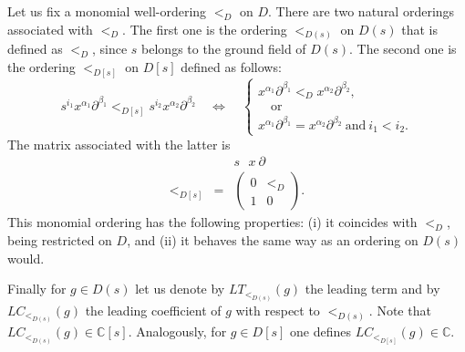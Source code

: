 \documentclass[a4paper,12pt]{amsart}
\theoremstyle{plain}
\theoremstyle{definition}
\theoremstyle{remark}
\def\CC{\mathbb{C}}
\begin{document}
Let us fix a monomial well-ordering $<_D$ on $D$. There are two natural orderings associated with $<_D$.
The first one is the ordering $<_{D(s)}$ on $D(s)$ that is defined as $<_D$, since $s$ belongs to the ground field of $D(s)$.
The second one is the ordering $<_{D[s]}$ on $D[s]$ defined as follows: 
\begin{equation}\label{monomial-ordering-Ds}
s^{i_1} x^{\alpha_1} \partial^{\beta_1} <_{D[s]} s^{i_2} x^{\alpha_2} \partial^{\beta_2}
\quad \Longleftrightarrow \quad
\begin{cases}
x^{\alpha_1} \partial^{\beta_1} <_D x^{\alpha_2} \partial^{\beta_2}, \\
\quad \text{or} \\[3pt]
x^{\alpha_1} \partial^{\beta_1} = x^{\alpha_2} \partial^{\beta_2} \ \text{and} \ i_1 < i_2.
\end{cases}
\end{equation}
The matrix associated with the latter is
\[
\begin{array}{ccc}
&& s \ \ \ x \ \partial \ \\
<_{D[s]} & = & \left(\begin{array}{c|c} 0 & <_D \\ \hline 1 & 0 \end{array}\right).
\end{array}
\]
This monomial ordering has the following properties: (i) it coincides with $<_D$, being restricted on $D$, and (ii) it behaves the same way as an ordering on $D(s)$ would.

Finally for $g \in D(s)$ let us denote by $LT_{<_{D(s)}}(g)$ the leading term
and by $LC_{<_{D(s)}}(g)$ the leading coefficient of $g$ with respect to $<_{D(s)}$. Note that $LC_{<_{D(s)}}(g) \in \CC[s]$. 
Analogously, for $g \in D[s]$ one defines $LC_{<_{D[s]}}(g) \in \CC$. 
\end{document}
